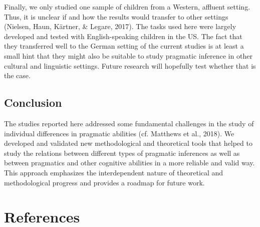 \documentclass[
  man,floatsintext]{apa6}
\begin{document}
Finally, we only studied one sample of children from a Western, affluent setting. Thus, it is unclear if and how the results would transfer to other settings (Nielsen, Haun, Kärtner, \& Legare, 2017). The tasks used here were largely developed and tested with English-speaking children in the US. The fact that they transferred well to the German setting of the current studies is at least a small hint that they might also be suitable to study pragmatic inference in other cultural and linguistic settings. Future research will hopefully test whether that is the case.

\hypertarget{conclusion}{%
\subsection{Conclusion}\label{conclusion}}

The studies reported here addressed some fundamental challenges in the study of individual differences in pragmatic abilities (cf. Matthews et al., 2018). We developed and validated new methodological and theoretical tools that helped to study the relations between different types of pragmatic inferences as well as between pragmatics and other cognitive abilities in a more reliable and valid way. This approach emphasizes the interdependent nature of theoretical and methodological progress and provides a roadmap for future work.

\newpage

\hypertarget{references}{%
\section{References}\label{references}}

\begingroup
\setlength{\parindent}{-0.5in}
\setlength{\leftskip}{0.5in}
\end{document}
